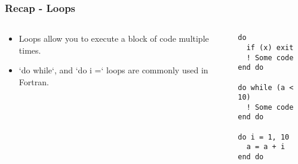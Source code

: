 \begin{frame}[fragile]
  \frametitle{Recap - Loops}
  \begin{columns}[T]
    \begin{column}{0.5\textwidth}
    \begin{itemize}
        \item Loops allow you to execute a block of code multiple times.
        \item `do while`, and `do i =` loops are commonly used in Fortran.
      \end{itemize}
    \end{column}

    \begin{column}{0.5\textwidth}
      \begin{lstlisting}
do
  if (x) exit
  ! Some code
end do

do while (a < 10)
  ! Some code
end do

do i = 1, 10
  a = a + i
end do
      \end{lstlisting}
    \end{column}
  \end{columns}
\end{frame}

